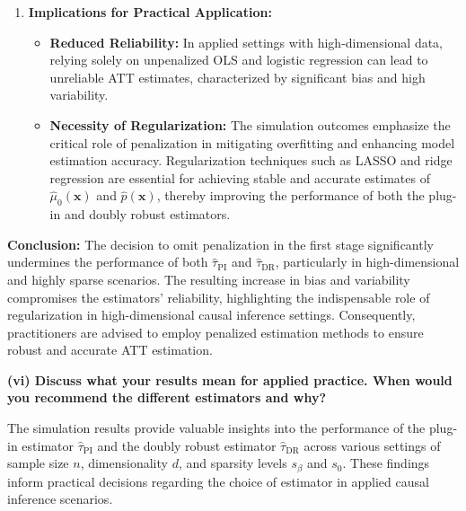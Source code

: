 \documentclass{article}
\begin{document}
\begin{enumerate}
  \item \textbf{Implications for Practical Application:}
    \begin{itemize}
      \item \textbf{Reduced Reliability:} In applied settings with high-dimensional data, relying solely on unpenalized OLS and logistic regression can lead to unreliable ATT estimates, characterized by significant bias and high variability.
      \item \textbf{Necessity of Regularization:} The simulation outcomes emphasize the critical role of penalization in mitigating overfitting and enhancing model estimation accuracy. Regularization techniques such as LASSO and ridge regression are essential for achieving stable and accurate estimates of \( \hat{\mu}_0(\mathbf{x}) \) and \( \hat{p}(\mathbf{x}) \), thereby improving the performance of both the plug-in and doubly robust estimators.
    \end{itemize}
\end{enumerate}

\textbf{Conclusion:}
The decision to omit penalization in the first stage significantly undermines the performance of both \( \hat{\tau}_{\text{PI}} \) and \( \hat{\tau}_{\text{DR}} \), particularly in high-dimensional and highly sparse scenarios. The resulting increase in bias and variability compromises the estimators' reliability, highlighting the indispensable role of regularization in high-dimensional causal inference settings. Consequently, practitioners are advised to employ penalized estimation methods to ensure robust and accurate ATT estimation.

\textbf{(vi) Discuss what your results mean for applied practice. When would you recommend the different estimators and why?}

The simulation results provide valuable insights into the performance of the plug-in estimator \( \hat{\tau}_{\text{PI}} \) and the doubly robust estimator \( \hat{\tau}_{\text{DR}} \) across various settings of sample size \( n \), dimensionality \( d \), and sparsity levels \( s_\beta \) and \( s_0 \). These findings inform practical decisions regarding the choice of estimator in applied causal inference scenarios.
\end{document}
